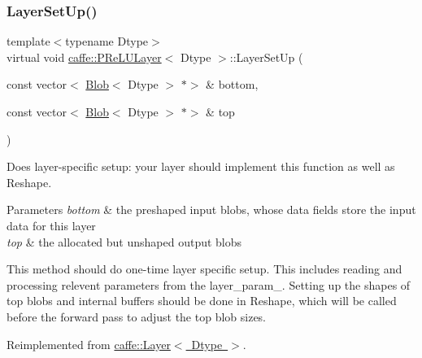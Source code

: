 \subsubsection{\texorpdfstring{Layer\+Set\+Up()}{LayerSetUp()}\hspace{0.1cm}{\footnotesize\ttfamily [1/2]}}
{\footnotesize\ttfamily template$<$typename Dtype$>$ \\
virtual void \mbox{\hyperlink{classcaffe_1_1_p_re_l_u_layer}{caffe\+::\+P\+Re\+L\+U\+Layer}}$<$ Dtype $>$\+::Layer\+Set\+Up (\begin{DoxyParamCaption}\item[{const vector$<$ \mbox{\hyperlink{classcaffe_1_1_blob}{Blob}}$<$ Dtype $>$ $\ast$$>$ \&}]{bottom,  }\item[{const vector$<$ \mbox{\hyperlink{classcaffe_1_1_blob}{Blob}}$<$ Dtype $>$ $\ast$$>$ \&}]{top }\end{DoxyParamCaption})\hspace{0.3cm}{\ttfamily [virtual]}}



Does layer-\/specific setup\+: your layer should implement this function as well as Reshape. 


\begin{DoxyParams}{Parameters}
{\em bottom} & the preshaped input blobs, whose data fields store the input data for this layer \\
\hline
{\em top} & the allocated but unshaped output blobs\\
\hline
\end{DoxyParams}
This method should do one-\/time layer specific setup. This includes reading and processing relevent parameters from the {\ttfamily layer\+\_\+param\+\_\+}. Setting up the shapes of top blobs and internal buffers should be done in {\ttfamily Reshape}, which will be called before the forward pass to adjust the top blob sizes. 

Reimplemented from \mbox{\hyperlink{classcaffe_1_1_layer_a481323a3e0972c682787f2137468c29f}{caffe\+::\+Layer$<$ Dtype $>$}}.

\mbox{\label{classcaffe_1_1_p_re_l_u_layer_a85e7207b664a4db8eb718f2075f44920}} 
